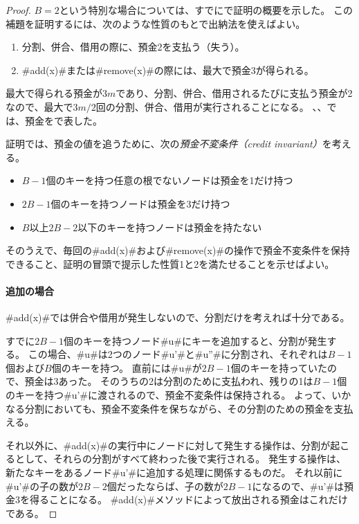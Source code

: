 \begin{proof}
   $B=2$という特別な場合については、すでにで証明の概要を示した。
   この補題を証明するには、次のような性質のもとで出納法を使えばよい。
  \begin{enumerate}
    \item 分割、併合、借用の際に、預金2を支払う（失う）。
    \item #add(x)#または#remove(x)#の際には、最大で預金3が得られる。
  \end{enumerate}
  最大で得られる預金が$3m$であり、分割、併合、借用されるたびに支払う預金が2なので、最大で$3m/2$回の分割、併合、借用が実行されることになる。
  、、では、預金を\cent{}で表した。

  証明では、預金の値を追うために、次の\emph{預金不変条件（credit invariant）}を考える。%
  \begin{itemize}
  \item $B-1$個のキーを持つ任意の根でないノードは預金を1だけ持つ
  \item $2B-1$個のキーを持つノードは預金を3だけ持つ
  \item $B$以上$2B-2$以下のキーを持つノードは預金を持たない
  \end{itemize}
  そのうえで、毎回の#add(x)#および#remove(x)#の操作で預金不変条件を保持できること、証明の冒頭で提示した性質1と2を満たせることを示せばよい。

  \paragraph{追加の場合}
  #add(x)#では併合や借用が発生しないので、分割だけを考えれば十分である。

  すでに$2B-1$個のキーを持つノード#u#にキーを追加すると、分割が発生する。
  この場合、#u#は2つのノード#u'#と#u''#に分割され、それぞれは$B-1$個および$B$個のキーを持つ。
  直前には#u#が$2B-1$個のキーを持っていたので、預金は3あった。
  そのうちの2は分割のために支払われ、残りの1は$B-1$個のキーを持つ#u'#に渡されるので、預金不変条件は保持される。
  よって、いかなる分割においても、預金不変条件を保ちながら、その分割のための預金を支払える。

  それ以外に、#add(x)#の実行中にノードに対して発生する操作は、分割が起こるとして、それらの分割がすべて終わった後で実行される。
  発生する操作は、新たなキーをあるノード#u'#に追加する処理に関係するものだ。
  それ以前に#u'#の子の数が$2B-2$個だったならば、子の数が$2B-1$になるので、#u'#は預金3を得ることになる。
  #add(x)#メソッドによって放出される預金はこれだけである。


\end{proof}
